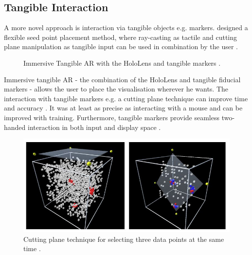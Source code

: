 \subsection{Tangible Interaction}
\label{subsection:TangibleInteraction}
A more novel approach is interaction via tangible objects e.g. markers. \cite{Besancon2017} designed a flexible seed point placement method, where ray-casting as tactile and cutting plane manipulation as tangible input can be used in combination by the user \autocite[885]{Besancon2017}.
\begin{figure}[!ht]%
    \centering
    \qquad
    \caption{Immersive Tangible AR with the HoloLens and tangible markers \autocite{Bach2018}.}%
    \label{fig:ImmersiveAR}%
\end{figure}
\newline Immersive tangible \ac{AR} - the combination of the HoloLens and tangible fiducial markers - allows the user to place the visualisation wherever he wants. The interaction with tangible markers e.g. a cutting plane technique can improve time and accuracy \autocite[]{Bach2018}. It was at least as precise as interacting with a mouse and can be improved with training. Furthermore, tangible markers provide seamless two-handed interaction in both input and display space \autocite[]{Billinghurst2008}.
 \begin{figure}[!ht]
    \centering
	\includegraphics[width=0.5 \textwidth]{images/Bach2018_CuttingPlane-jpg.JPG}
	\caption{
		Cutting plane technique for selecting three data points at the same time \autocite{Bach2018}.
	}
	\label{figure:CuttingPlane} 
\end{figure}

